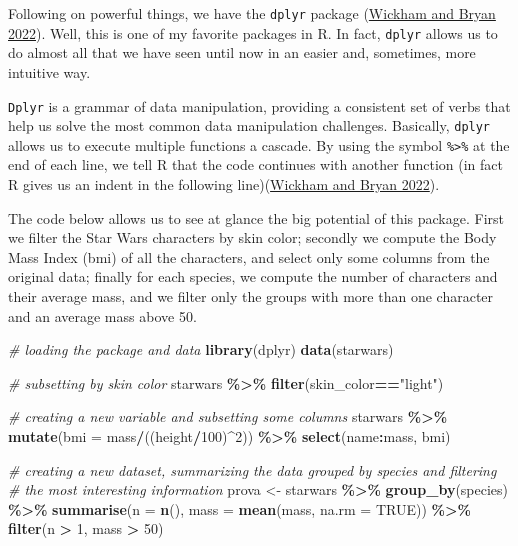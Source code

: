 \documentclass[
]{article}
\newenvironment{Shaded}{\begin{snugshade}}{\end{snugshade}}
\newcommand{\AttributeTok}[1]{\textcolor[rgb]{0.13,0.29,0.53}{#1}}
\newcommand{\CommentTok}[1]{\textcolor[rgb]{0.56,0.35,0.01}{\textit{#1}}}
\newcommand{\ConstantTok}[1]{\textcolor[rgb]{0.56,0.35,0.01}{#1}}
\newcommand{\DecValTok}[1]{\textcolor[rgb]{0.00,0.00,0.81}{#1}}
\newcommand{\FunctionTok}[1]{\textcolor[rgb]{0.13,0.29,0.53}{\textbf{#1}}}
\newcommand{\NormalTok}[1]{#1}
\newcommand{\OtherTok}[1]{\textcolor[rgb]{0.56,0.35,0.01}{#1}}
\newcommand{\SpecialCharTok}[1]{\textcolor[rgb]{0.81,0.36,0.00}{\textbf{#1}}}
\newcommand{\StringTok}[1]{\textcolor[rgb]{0.31,0.60,0.02}{#1}}
\begin{document}
Following on powerful things, we have the \texttt{dplyr} package
(\protect\hyperlink{ref-wickham2022}{Wickham and Bryan 2022}). Well, this is one of my favorite packages in R. In fact,
\texttt{dplyr} allows us to do almost all that we have seen until now in an
easier and, sometimes, more intuitive way.

\texttt{Dplyr} is a grammar of data manipulation, providing a consistent set of
verbs that help us solve the most common data manipulation challenges.
Basically, \texttt{dplyr} allows us to execute multiple functions a cascade. By
using the symbol \texttt{\%\textgreater{}\%} at the end of each line, we tell R that the code
continues with another function (in fact R gives us an indent in the
following line)(\protect\hyperlink{ref-wickham2022}{Wickham and Bryan 2022}).

The code below allows us to see at glance the big potential of this
package. First we filter the Star Wars characters by skin color;
secondly we compute the Body Mass Index (bmi) of all the characters, and
select only some columns from the original data; finally for each
species, we compute the number of characters and their average mass, and
we filter only the groups with more than one character and an average
mass above 50.

\begin{Shaded}
\begin{Highlighting}[]
\CommentTok{\# loading the package and data}
\FunctionTok{library}\NormalTok{(dplyr)}
\FunctionTok{data}\NormalTok{(starwars)}

\CommentTok{\# subsetting by skin color}
\NormalTok{starwars }\SpecialCharTok{\%\textgreater{}\%}
        \FunctionTok{filter}\NormalTok{(skin\_color}\SpecialCharTok{==}\StringTok{"light"}\NormalTok{)}

\CommentTok{\# creating a new variable and subsetting some columns}
\NormalTok{starwars }\SpecialCharTok{\%\textgreater{}\%}
        \FunctionTok{mutate}\NormalTok{(}\AttributeTok{bmi =}\NormalTok{ mass}\SpecialCharTok{/}\NormalTok{((height}\SpecialCharTok{/}\DecValTok{100}\NormalTok{)}\SpecialCharTok{\^{}}\DecValTok{2}\NormalTok{)) }\SpecialCharTok{\%\textgreater{}\%}
        \FunctionTok{select}\NormalTok{(name}\SpecialCharTok{:}\NormalTok{mass, bmi)}

\CommentTok{\# creating a new dataset, summarizing the data grouped by species and filtering}
\CommentTok{\# the most interesting information}
\NormalTok{prova }\OtherTok{\textless{}{-}}\NormalTok{ starwars }\SpecialCharTok{\%\textgreater{}\%}
        \FunctionTok{group\_by}\NormalTok{(species) }\SpecialCharTok{\%\textgreater{}\%}
        \FunctionTok{summarise}\NormalTok{(}\AttributeTok{n =} \FunctionTok{n}\NormalTok{(), }
                  \AttributeTok{mass =} \FunctionTok{mean}\NormalTok{(mass, }\AttributeTok{na.rm =} \ConstantTok{TRUE}\NormalTok{)) }\SpecialCharTok{\%\textgreater{}\%}
        \FunctionTok{filter}\NormalTok{(n }\SpecialCharTok{\textgreater{}} \DecValTok{1}\NormalTok{, }
\NormalTok{               mass }\SpecialCharTok{\textgreater{}} \DecValTok{50}\NormalTok{)}
\end{Highlighting}
\end{Shaded}
\end{document}
